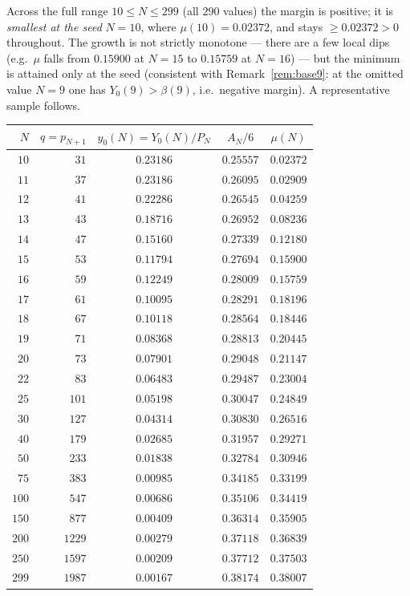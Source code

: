 \documentclass[11pt]{amsart}
\theoremstyle{plain}
\theoremstyle{definition}
\begin{document}
Across the full range $10\le N\le 299$ (all $290$ values) the margin is positive;
it is \emph{smallest at the seed} $N=10$, where $\mu(10)=0.02372$, and stays
$\ge 0.02372>0$ throughout.  The growth is not strictly monotone --- there are a
few local dips (e.g.\ $\mu$ falls from $0.15900$ at $N=15$ to $0.15759$ at
$N=16$) --- but the minimum is attained only at the seed (consistent with
Remark~\ref{rem:base9}: at the omitted value $N=9$ one has $Y_0(9)>\beta(9)$, i.e.\
negative margin).  A representative sample follows.

\begin{center}
\small
\begin{tabular}{rrccc}
\hline
$N$ & $q=p_{N+1}$ & $y_0(N)=Y_0(N)/P_N$ & $A_N/6$ & $\mu(N)$ \\
\hline
$10$  & $31$   & $0.23186$ & $0.25557$ & $0.02372$ \\
$11$  & $37$   & $0.23186$ & $0.26095$ & $0.02909$ \\
$12$  & $41$   & $0.22286$ & $0.26545$ & $0.04259$ \\
$13$  & $43$   & $0.18716$ & $0.26952$ & $0.08236$ \\
$14$  & $47$   & $0.15160$ & $0.27339$ & $0.12180$ \\
$15$  & $53$   & $0.11794$ & $0.27694$ & $0.15900$ \\
$16$  & $59$   & $0.12249$ & $0.28009$ & $0.15759$ \\
$17$  & $61$   & $0.10095$ & $0.28291$ & $0.18196$ \\
$18$  & $67$   & $0.10118$ & $0.28564$ & $0.18446$ \\
$19$  & $71$   & $0.08368$ & $0.28813$ & $0.20445$ \\
$20$  & $73$   & $0.07901$ & $0.29048$ & $0.21147$ \\
$22$  & $83$   & $0.06483$ & $0.29487$ & $0.23004$ \\
$25$  & $101$  & $0.05198$ & $0.30047$ & $0.24849$ \\
$30$  & $127$  & $0.04314$ & $0.30830$ & $0.26516$ \\
$40$  & $179$  & $0.02685$ & $0.31957$ & $0.29271$ \\
$50$  & $233$  & $0.01838$ & $0.32784$ & $0.30946$ \\
$75$  & $383$  & $0.00985$ & $0.34185$ & $0.33199$ \\
$100$ & $547$  & $0.00686$ & $0.35106$ & $0.34419$ \\
$150$ & $877$  & $0.00409$ & $0.36314$ & $0.35905$ \\
$200$ & $1229$ & $0.00279$ & $0.37118$ & $0.36839$ \\
$250$ & $1597$ & $0.00209$ & $0.37712$ & $0.37503$ \\
$299$ & $1987$ & $0.00167$ & $0.38174$ & $0.38007$ \\
\hline
\end{tabular}
\end{center}
\end{document}

